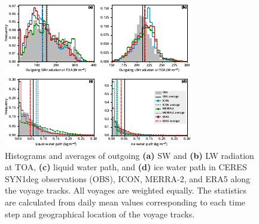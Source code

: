 \documentclass[draft]{agujournal2019}
\begin{document}
\begin{figure}[t]
\centering
\includegraphics[width=\textwidth]{img/stats_hist.pdf}
\caption{
Histograms and averages of outgoing \textbf{(a)} SW and \textbf{(b)} LW radiation at TOA, \textbf{(c)} liquid water path, and \textbf{(d)} ice water path in CERES SYN1deg observations (OBS), ICON, MERRA-2, and ERA5 along the voyage tracks. All voyages are weighted equally. The statistics are calculated from daily mean values corresponding to each time step and geographical location of the voyage tracks.
}
\label{fig:stats-hist}
\end{figure}
\end{document}
